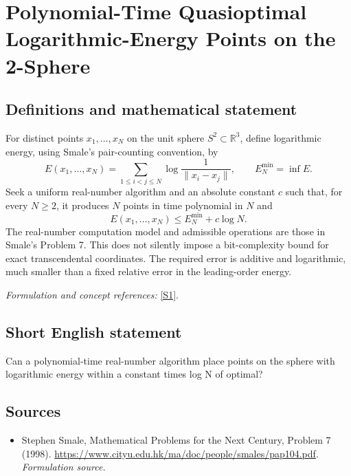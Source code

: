 \documentclass[11pt]{article}
\begin{document}
\section*{\texorpdfstring{Polynomial-Time Quasioptimal Logarithmic-Energy Points on the 2-Sphere}{Polynomial-Time Quasioptimal Logarithmic-Energy Points on the 2-Sphere}}\label{statement}
\subsection{Definitions and mathematical statement}
For distinct points $x_1,\ldots,x_N$ on the unit sphere $S^2\subset{\mathbb{R}}^3$, define logarithmic energy, using Smale's pair-counting convention, by
\[
 E(x_1,\ldots,x_N)=\sum_{1\le i<j\le N}
 \log\frac1{\|x_i-x_j\|},\qquad E_N^{\min}=\inf E.
\]
Seek a uniform real-number algorithm and an absolute constant $c$ such that, for every $N\ge2$, it produces $N$ points in time polynomial in $N$ and
\[
 E(x_1,\ldots,x_N)\le E_N^{\min}+c\log N.
\]
The real-number computation model and admissible operations are those in Smale's Problem 7. This does not silently impose a bit-complexity bound for exact transcendental coordinates. The required error is additive and logarithmic, much smaller than a fixed relative error in the leading-order energy.
\par\smallskip\textit{Formulation and concept references:} \href{https://www.cityu.edu.hk/ma/doc/people/smales/pap104.pdf}{[S1]}.

\subsection{Short English statement}
Can a polynomial-time real-number algorithm place points on the sphere with logarithmic energy within a constant times log N of optimal?
\subsection{Sources}
\begin{itemize}
\item[S1]Stephen Smale, Mathematical Problems for the Next Century, Problem 7 (1998).
\url{https://www.cityu.edu.hk/ma/doc/people/smales/pap104.pdf}.
\textit{Formulation source.}
\end{itemize}
\end{document}
